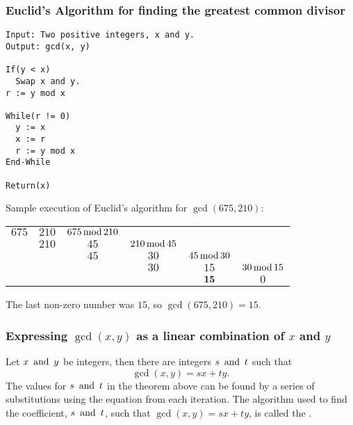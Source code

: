\subsubsection*{Euclid's Algorithm for finding the greatest common divisor}
\begin{lstlisting}
Input: Two positive integers, x and y.
Output: gcd(x, y)

If(y < x)
  Swap x and y.
r := y mod x

While(r != 0)
  y := x
  x := r
  r := y mod x
End-While

Return(x)
\end{lstlisting}
Sample execution of Euclid's algorithm for $\gcd(675,210)$:
\begin{center}
    \begin{tabular}{cccccc}
        $675$ & $210$ & $675 \operatorname{\text{mod}} 210$                                                  \\
              & $210$ & $45$            & $210 \operatorname{\text{mod}} 45$                                 \\
              &       & $45$            & $30$           & $45 \operatorname{\text{mod}} 30$                 \\
              &       &                 & $30$           & $15$          & $30 \operatorname{\text{mod}} 15$ \\
              &       &                 &                & $\textbf{15}$    & $0$           \\
    \end{tabular}
\end{center}
The last non-zero number was $15$, so $\gcd(675,210) = 15$.

\subsubsection*{Expressing $\gcd(x,y)$ as a linear combination of $x$ and $y$}
Let $x \operatorname{~\text{and}~} y$ be integers, then there are integers $s \operatorname{~\text{and}~} t$ such that
\[
    \gcd(x,y) = sx + ty.
\]
The values for $s \operatorname{~\text{and}~} t$ in the theorem above can be found by a series of substitutions using the equation from each iteration. The algorithm used to find the coefficient, $s \operatorname{~\text{and}~} t$, such that $\gcd(x,y) = sx + ty$, is called the .

